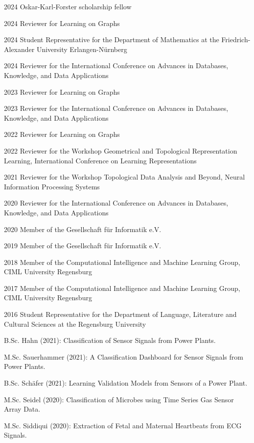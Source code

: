 \documentclass[a4paper, 11pt]{article}
\newcommand{\years}[1]{\marginnote{\scriptsize #1}}
\begin{document}
\years{Service}
\vspace{-10pt}
\begin{etaremune}[itemsep=-5pt, leftmargin=15pt]
	\item[2024] Oskar-Karl-Forster scholarship fellow
	\item[2024] Reviewer for Learning on Graphs
	\item[2024] Student Representative for the Department of Mathematics at the Friedrich-Alexander University Erlangen-Nürnberg
	\item[2024] Reviewer for the International Conference on Advances in Databases, Knowledge, and Data Applications
	\item[2023] Reviewer for Learning on Graphs
	\item[2023] Reviewer for the International Conference on Advances in Databases, Knowledge, and Data Applications
	\item[2022] Reviewer for Learning on Graphs
	\item[2022] Reviewer for the Workshop Geometrical and Topological Representation Learning, International Conference on Learning Representations
	\item[2021] Reviewer for the Workshop Topological Data Analysis and Beyond, Neural Information Processing Systems
	\item[2020] Reviewer for the International Conference on Advances in Databases, Knowledge, and Data Applications
	\item[2020] Member of the Gesellschaft für Informatik e.V.
	\item[2019] Member of the Gesellschaft für Informatik e.V.
	\item[2018] Member of the Computational Intelligence and Machine Learning Group, CIML University Regensburg
	\item[2017] Member of the Computational Intelligence and Machine Learning Group, CIML University Regensburg
	\item[2016] Student Representative for the Department of Language, Literature and Cultural Sciences at the Regensburg University
\end{etaremune}
\vspace{10pt}

\years{Supervision}
\vspace{-10pt}
\begin{etaremune}[itemsep=-5pt, leftmargin=15pt]
	\item B.Sc. Hahn (2021): Classification of Sensor Signals from Power Plants.
	\item M.Sc. Sauerhammer (2021): A Classification Dashboard for Sensor Signals from Power Plants.
	\item B.Sc. Schäfer (2021): Learning Validation Models from Sensors of a Power Plant.
	\item M.Sc. Seidel (2020): Classification of Microbes using Time Series Gas Sensor Array Data.
	\item M.Sc. Siddiqui (2020): Extraction of Fetal and Maternal Heartbeats from ECG Signals.
\end{etaremune}
\end{document}
